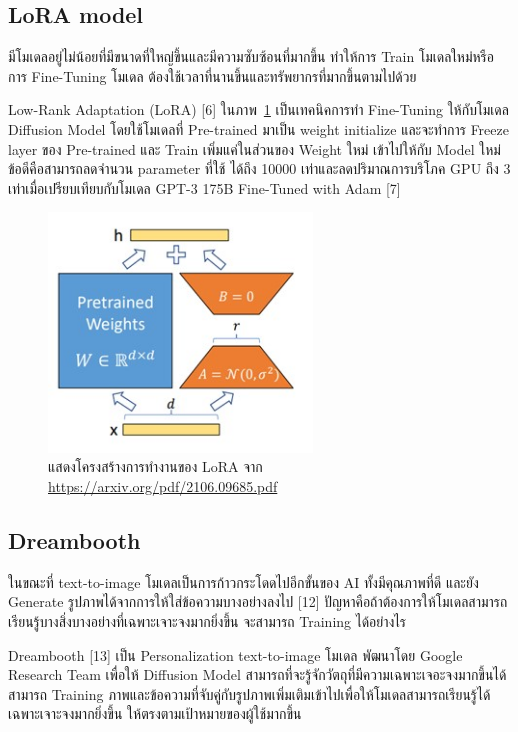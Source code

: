 \documentclass[12pt,oneside,openright,a4paper]{cpe-thai-project}
\begin{document}
\subsection{LoRA model}
\hspace {18pt} มีโมเดลอยู่ไม่น้อยที่มีขนาดที่ใหญ่ขึ้นและมีความซับซ้อนที่มากขึ้น ทำให้การ Train โมเดลใหม่หรือ การ Fine-Tuning โมเดล ต้องใช้เวลาที่นานขึ้นและทรัพยากรที่มากขึ้นตามไปด้วย 

\hspace {18pt} Low-Rank Adaptation (LoRA) [6] ในภาพ~\ref{fig:lora} เป็นเทคนิคการทำ Fine-Tuning ให้กับโมเดล Diffusion Model โดยใช้โมเดลที่ Pre-trained มาเป็น weight initialize และจะทำการ Freeze layer ของ Pre-trained และ Train เพิ่มแค่ในส่วนของ Weight ใหม่ เข้าไปให้กับ Model ใหม่ ข้อดีคือสามารถลดจำนวน parameter ที่ใช้ ได้ถึง 10000 เท่าและลดปริมาณการบริโภค GPU ถึง 3 เท่าเมื่อเปรียบเทียบกับโมเดล GPT-3 175B Fine-Tuned with Adam [7] 

\begin{figure}[!h]\centering
\includegraphics[width=7cm]{image/lora.jpg}
\caption{แสดงโครงสร้างการทำงานของ LoRA จาก \url{https://arxiv.org/pdf/2106.09685.pdf}}
\label{fig:lora}
\end{figure}

\vspace{\fill}\clearpage

\subsection{Dreambooth}
\hspace {18pt} ในขณะที่ text-to-image โมเดลเป็นการก้าวกระโดดไปอีกขั้นของ AI ทั้งมีคุณภาพที่ดี และยัง Generate รูปภาพได้จากการให้ใส่ข้อความบางอย่างลงไป [12] ปัญหาคือถ้าต้องการให้โมเดลสามารถเรียนรู้บางสิ่งบางอย่างที่เฉพาะเจาะจงมากยิ่งขึ้น จะสามารถ Training ได้อย่างไร

\hspace {18pt} Dreambooth [13] เป็น Personalization text-to-image  โมเดล พัฒนาโดย Google Research Team เพื่อให้ Diffusion Model สามารถที่จะรู้จักวัตถุที่มีความเฉพาะเจอะจงมากขึ้นได้ สามารถ Training ภาพและข้อความที่จับคู่กับรูปภาพเพิ่มเติมเข้าไปเพื่อให้โมเดลสามารถเรียนรู้ได้เฉพาะเจาะจงมากยิ่งขึ้น ให้ตรงตามเป้าหมายของผู้ใช้มากขึ้น
\end{document}
